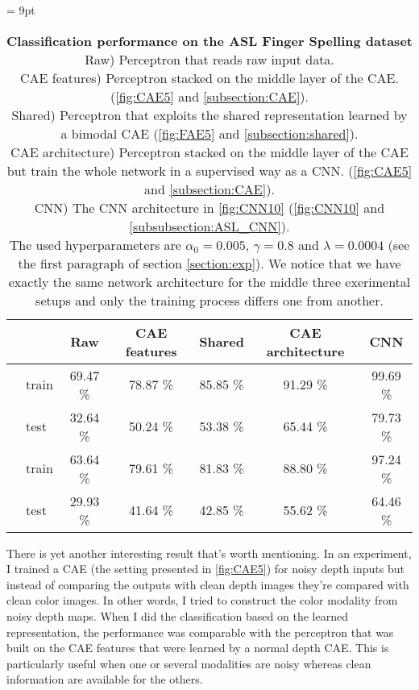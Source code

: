 \begin{table}[H]
  \tabcolsep = 9pt
  \caption{\textbf{Classification performance on the ASL Finger Spelling
    dataset}\\[0.1em]
    Raw) Perceptron that reads raw input data.\\[0.1em]
    CAE features) Perceptron stacked on the middle layer of the CAE.
      (\autoref{fig:CAE5} and \ref{subsection:CAE}).\\[0.1em]
    Shared) Perceptron that exploits the shared representation learned
      by a bimodal CAE (\autoref{fig:FAE5} and
      \ref{subsection:shared}).\\[0.1em]
    CAE architecture) Perceptron stacked on the middle layer of the CAE
      but train the whole network in a supervised way as a CNN.
      (\autoref{fig:CAE5} and \ref{subsection:CAE}).\\[0.1em]
    CNN) The CNN architecture in \autoref{fig:CNN10}
      (\autoref{fig:CNN10} and \ref{subsubsection:ASL_CNN}). \\[0.1em]
    The used hyperparameters are $\alpha_0=0.005$, $\gamma=0.8$ and
    $\lambda=0.0004$ (see the first paragraph of section \ref{section:exp}).
    We notice that we have exactly the same network
    architecture for the middle three exerimental setups and only the
    training process differs one from another.
    }
  \label{tab:ASL_classif}
  \begin{tabular*}{\linewidth}{>{\bf}llccccc}
    \toprule
    && Raw & CAE features & Shared & CAE architecture & CNN\\
    \midrule
    \multirow{2}{*}{Intensity} &
    train & 69.47 \% & 78.87 \% & 85.85 \% & 91.29 \% & 99.69 \% \\
    & test & 32.64 \% & 50.24 \% & 53.38 \% & 65.44 \% & 79.73 \% \\
    \midrule
    \multirow{2}{*}{Depth} &
    train & 63.64 \% & 79.61 \% & 81.83 \% & 88.80 \% & 97.24 \% \\
    & test & 29.93 \% & 41.64 \% & 42.85 \% & 55.62 \% & 64.46 \% \\
    \bottomrule
  \end{tabular*}
\end{table}
\vspace{-10pt}

There is yet another interesting result that's worth mentioning.
In an experiment, I trained a CAE (the setting presented in
\autoref{fig:CAE5}) for noisy depth inputs but instead of comparing
the outputs with clean depth images they're compared with clean
color images. In other words, I tried to construct the color modality from
noisy depth maps. When I did the classification based on the learned
representation, the performance was comparable with the perceptron
that was built on the CAE features that were learned by a normal
depth CAE. This is particularly useful when one or several
modalities are noisy whereas clean information are available for the others.

